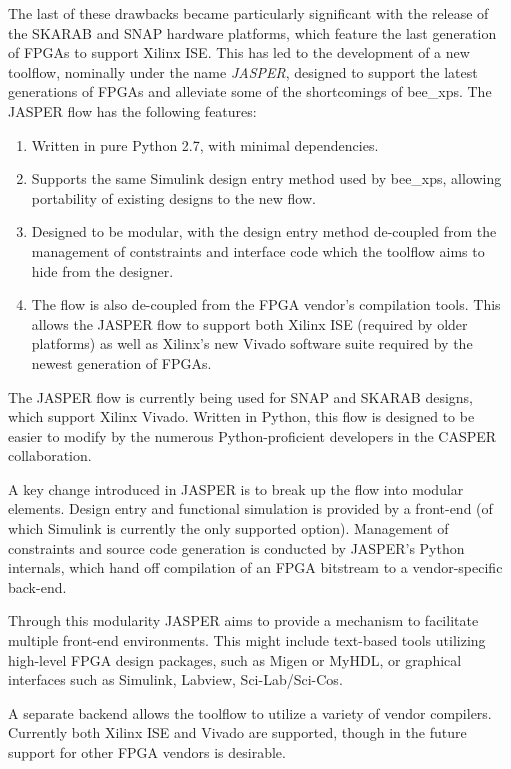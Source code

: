\documentclass{ws-jai}
\begin{document}
The last of these drawbacks became particularly significant with the release of the SKARAB and SNAP hardware platforms, which feature the last generation of FPGAs to support Xilinx ISE. This has led to the development of a new toolflow, nominally under the name \emph{JASPER}, designed to support the latest generations of FPGAs and alleviate some of the shortcomings of bee\_xps.
The JASPER flow has the following features:
\begin{enumerate}
 \item Written in pure Python 2.7, with minimal dependencies.
 \item Supports the same Simulink design entry method used by bee\_xps, allowing portability of existing designs to the new flow.
 \item Designed to be modular, with the design entry method de-coupled from the management of contstraints and interface code which the toolflow aims to hide from the designer.
 \item The flow is also de-coupled from the FPGA vendor's compilation tools. This allows the JASPER flow to support both Xilinx ISE (required by older platforms) as well as Xilinx's new Vivado software suite required by the newest generation of FPGAs.
\end{enumerate}

The JASPER flow is currently being used for SNAP and SKARAB designs, which support Xilinx Vivado. Written in Python, this flow is designed to be easier to modify by the numerous Python-proficient developers in the CASPER collaboration.

A key change introduced in JASPER is to break up the flow into modular elements. Design entry and functional simulation is provided by a front-end (of which Simulink is currently the only supported option). Management of constraints and source code generation is conducted by JASPER's Python internals, which hand off compilation of an FPGA bitstream to a vendor-specific back-end.
 
Through this modularity JASPER aims to provide a mechanism to facilitate multiple front-end environments. This might include text-based tools utilizing high-level FPGA design packages, such as Migen or MyHDL, or graphical interfaces such as Simulink, Labview, Sci-Lab/Sci-Cos.

A separate backend allows the toolflow to utilize a variety of vendor compilers. Currently both Xilinx ISE and Vivado are supported, though in the future support for other FPGA vendors is desirable.
\end{document}
